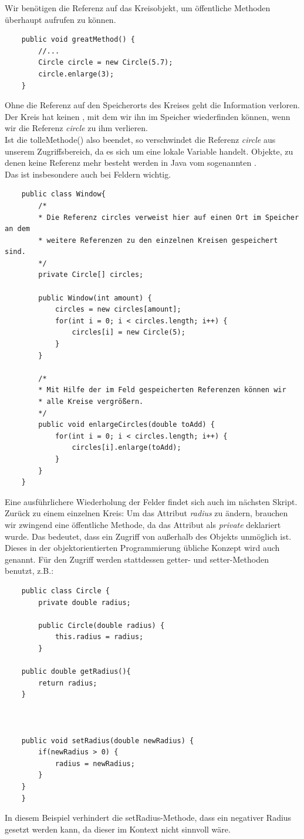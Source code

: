 \documentclass{article}
\begin{document}
\newpage
Wir benötigen die Referenz auf das Kreisobjekt, um öffentliche Methoden überhaupt aufrufen zu können. 
\begin{verbatim}
    public void greatMethod() {
        //... 
        Circle circle = new Circle(5.7);
        circle.enlarge(3);
    }
\end{verbatim}
Ohne die Referenz auf den Speicherorts des Kreises geht die Information verloren. Der Kreis hat keinen , mit dem wir ihn im Speicher wiederfinden können, wenn wir die Referenz \textit{circle} zu ihm verlieren. \\ 
Ist die tolleMethode() also beendet, so verschwindet die Referenz \textit{circle} aus unserem Zugriffsbereich, da es sich um eine lokale Variable handelt. Objekte, zu denen keine Referenz mehr besteht werden in Java vom sogenannten  . \\ 
Das  ist insbesondere auch bei Feldern wichtig. \\
\begin{verbatim}
    public class Window{
        /* 
        * Die Referenz circles verweist hier auf einen Ort im Speicher an dem 
        * weitere Referenzen zu den einzelnen Kreisen gespeichert sind. 
        */
        private Circle[] circles; 

        public Window(int amount) {
            circles = new circles[amount];
            for(int i = 0; i < circles.length; i++) {
                circles[i] = new Circle(5);
            }
        }

        /*
        * Mit Hilfe der im Feld gespeicherten Referenzen können wir 
        * alle Kreise vergrößern. 
        */
        public void enlargeCircles(double toAdd) {
            for(int i = 0; i < circles.length; i++) {
                circles[i].enlarge(toAdd);
            }
        }   
    }
\end{verbatim}
Eine ausführlichere Wiederholung der Felder findet sich auch im nächsten Skript. \\
Zurück zu einem einzelnen Kreis: Um das Attribut \textit{radius}  zu ändern, brauchen wir zwingend eine öffentliche Methode, da das Attribut als \textit{private} deklariert wurde. Das bedeutet, dass ein Zugriff von außerhalb des Objekts unmöglich ist. Dieses in der objektorientierten Programmierung übliche Konzept wird auch  genannt. Für den Zugriff werden stattdessen getter- und setter-Methoden benutzt, z.B.: 
\begin{verbatim}
    public class Circle {
        private double radius;

        public Circle(double radius) {
            this.radius = radius;
        }

    public double getRadius(){
        return radius;
    }



    public void setRadius(double newRadius) {
        if(newRadius > 0) {
            radius = newRadius;
        }
    }
    }
\end{verbatim}
In diesem Beispiel verhindert die setRadius-Methode, dass ein negativer Radius gesetzt werden kann, da dieser im Kontext nicht sinnvoll wäre. 
\end{document}
